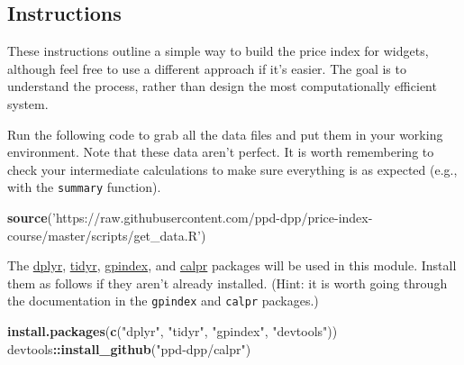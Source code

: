 \documentclass[]{article}
\newenvironment{Shaded}{\begin{snugshade}}{\end{snugshade}}
\newcommand{\KeywordTok}[1]{\textcolor[rgb]{0.13,0.29,0.53}{\textbf{#1}}}
\newcommand{\NormalTok}[1]{#1}
\newcommand{\OperatorTok}[1]{\textcolor[rgb]{0.81,0.36,0.00}{\textbf{#1}}}
\newcommand{\StringTok}[1]{\textcolor[rgb]{0.31,0.60,0.02}{#1}}
\begin{document}
\hypertarget{instructions}{%
\subsection{Instructions}\label{instructions}}

These instructions outline a simple way to build the price index for widgets, although feel free to use a different approach if it's easier. The goal is to understand the process, rather than design the most computationally efficient system.

Run the following code to grab all the data files and put them in your working environment. Note that these data aren't perfect. It is worth remembering to check your intermediate calculations to make sure everything is as expected (e.g., with the \texttt{summary} function).

\begin{Shaded}
\begin{Highlighting}[]
\KeywordTok{source}\NormalTok{(}\StringTok{'https://raw.githubusercontent.com/ppd-dpp/price-index-course/master/scripts/get_data.R'}\NormalTok{)}
\end{Highlighting}
\end{Shaded}

The \href{https://cran.r-project.org/package=dplyr}{dplyr}, \href{https://cran.r-project.org/package=tidyr}{tidyr}, \href{https://cran.r-project.org/package=gpindex}{gpindex}, and \href{https://github.com/ppd-dpp/calpr}{calpr} packages will be used in this module. Install them as follows if they aren't already installed. (Hint: it is worth going through the documentation in the \texttt{gpindex} and \texttt{calpr} packages.)

\begin{Shaded}
\begin{Highlighting}[]
\KeywordTok{install.packages}\NormalTok{(}\KeywordTok{c}\NormalTok{(}\StringTok{"dplyr"}\NormalTok{, }\StringTok{"tidyr"}\NormalTok{, }\StringTok{"gpindex"}\NormalTok{, }\StringTok{"devtools"}\NormalTok{))}
\NormalTok{devtools}\OperatorTok{::}\KeywordTok{install_github}\NormalTok{(}\StringTok{"ppd-dpp/calpr"}\NormalTok{)}
\end{Highlighting}
\end{Shaded}
\end{document}
